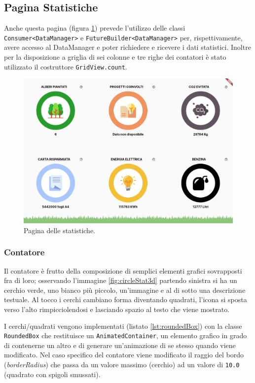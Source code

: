 \subsection{Pagina Statistiche}
Anche questa pagina (figura \ref{fig:statsPage}) prevede l'utilizzo delle classi \texttt{Consumer<DataManager>} e \texttt{FutureBuilder<DataManager>} per, rispettivamente, avere accesso al DataManager e poter richiedere e ricevere i dati statistici. Inoltre per la disposizione a griglia di sei colonne e tre righe dei contatori è stato utilizzato il costruttore \texttt{GridView.count}.
\begin{figure}[h!]
  \centering
  \includegraphics[width=\textwidth]{img/totem/screenshot/statsCircle.png}
  \caption{Pagina delle statistiche.}
  \label{fig:statsPage}
\end{figure}
\subsubsection{Contatore}
Il contatore è frutto della composizione di semplici elementi grafici sovrapposti fra di loro; osservando l'immagine \ref{fig:circleStat3d} partendo sinistra si ha un cerchio verde, uno bianco più piccolo, un'immagine e al di sotto una descrizione testuale. Al tocco i cerchi cambiano forma diventando quadrati, l'icona si sposta verso l'alto rimpicciolendosi e lasciando spazio al testo che viene mostrato.

I cerchi/quadrati vengono implementati (listato \ref{lst:roundedBox}) con la classe \texttt{RoundedBox} che restituisce un \texttt{AnimatedContainer}, un elemento grafico in grado di contenerne un altro e di generare un'animazione di se stesso quando viene modificato. Nel caso specifico del contatore viene modificato il raggio del bordo (\textit{borderRadius}) che passa da un valore massimo (cerchio) ad un valore di \texttt{10.0} (quadrato con spigoli smussati).

